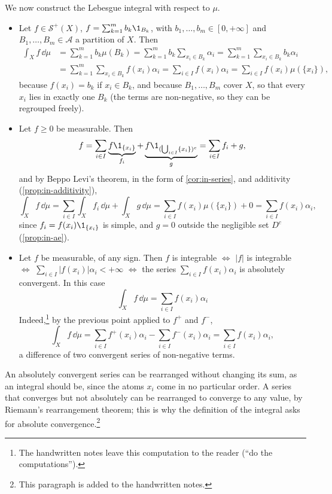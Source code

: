 \begin{example}
We now construct the Lebesgue integral with respect to $\mu$.
\begin{itemize}
  \item Let $f\in\mathcal S^+(X)$, $f=\sum_{k=1}^mb_k\1_{B_k}$, with $b_1,\dots,b_m\in[0,+\infty]$
    and $B_1,\dots,B_m\in\mathcal A$ a partition of $X$. Then
    \begin{align*}
      \int_Xf\,\dd\mu&=\sum_{k=1}^mb_k\mu(B_k)=\sum_{k=1}^mb_k\sum_{x_i\in B_k}\alpha_i
      =\sum_{k=1}^m\sum_{x_i\in B_k}b_k\alpha_i\\
      &=\sum_{k=1}^m\sum_{x_i\in B_k}f(x_i)\alpha_i
      =\sum_{i\in I}f(x_i)\alpha_i=\sum_{i\in I}f(x_i)\mu(\{x_i\}),
    \end{align*}
    because $f(x_i)=b_k$ if $x_i\in B_k$, and because $B_1,\dots,B_m$ cover $X$, so that every
    $x_i$ lies in exactly one $B_k$ (the terms are non-negative, so they can be regrouped
    freely).
  \item Let $f\ge0$ be measurable. Then
    \[
      f=\sum_{i\in I}\underbrace{f\1_{\{x_i\}}}_{f_i}+\underbrace{f\1_{(\bigcup_{i\in I}\{x_i\})^c}}_{g}
      =\sum_{i\in I}f_i+g,
    \]
    and by Beppo Levi's theorem, in the form of \cref{cor:in-series}, and additivity
    (\cref{prop:in-additivity}),
    \[
      \int_Xf\,\dd\mu=\sum_{i\in I}\int_Xf_i\,\dd\mu+\int_Xg\,\dd\mu
      =\sum_{i\in I}f(x_i)\mu(\{x_i\})+0=\sum_{i\in I}f(x_i)\alpha_i,
    \]
    since $f_i=f(x_i)\1_{\{x_i\}}$ is simple, and $g=0$ outside the negligible set $D^c$
    (\cref{prop:in-ae}).
  \item Let $f$ be measurable, of any sign. Then $f$ is integrable $\iff$ $|f|$ is integrable
    $\iff$ $\sum_{i\in I}|f(x_i)|\alpha_i<+\infty$ $\iff$ the series
    $\sum_{i\in I}f(x_i)\alpha_i$ is absolutely convergent. In this case
    \begin{equation}\label{eq:ig-discrete-integral}
      \boxed{\ \int_Xf\,\dd\mu=\sum_{i\in I}f(x_i)\alpha_i\ }
    \end{equation}
    Indeed,\footnote{The handwritten notes leave this computation to the reader (``do the
    computations'').} by the previous point applied to $f^+$ and $f^-$,
    \[
      \int_Xf\,\dd\mu=\sum_{i\in I}f^+(x_i)\alpha_i-\sum_{i\in I}f^-(x_i)\alpha_i
      =\sum_{i\in I}f(x_i)\alpha_i,
    \]
    a difference of two convergent series of non-negative terms.
\end{itemize}
\end{example}

An absolutely convergent series can be rearranged without changing its sum, as an integral
should be, since the atoms $x_i$ come in no particular order. A series that converges but not
absolutely can be rearranged to converge to any value, by Riemann's rearrangement theorem; this
is why the definition of the integral asks for absolute convergence.\footnote{This paragraph is
added to the handwritten notes.}


